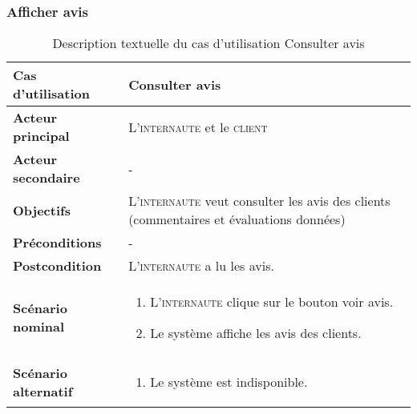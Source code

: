         \subsubsection[Consulter avis]{Afficher avis}
            \begin{longtable}{p{4cm} p{9cm}}
                \caption{Description textuelle du cas d’utilisation Consulter avis}
                \label{table:usecaseConsulterAvis}
                \\\hline\hline
                    \textbf{Cas d’utilisation} & \textbf{Consulter avis}
                \\\hline\hline
                        \textbf{Acteur principal} & L’\textsc{internaute} et le \textsc{client}
                    \\
                        \textbf{Acteur secondaire} & -
                    \\
                        \textbf{Objectifs} & L’\textsc{internaute} veut consulter les
                        avis des clients (commentaires et évaluations données)
                    \\
                        \textbf{Préconditions} & -
                    \\
                    \textbf{Postcondition} & L’\textsc{internaute} a lu les avis.
                    \\
                    \textbf{Scénario nominal} &
                        \begin{enumerate}[leftmargin=*]
                            \item L’\textsc{internaute} clique sur le bouton
                            voir avis.
                            \item Le système affiche les avis des clients.
                        \end{enumerate}
                    \\
                    \textbf{Scénario alternatif} &
                        \begin{enumerate}[leftmargin=*]
                            \item Le système est indisponible.
                        \end{enumerate}
                \\\bottomrule
            \end{longtable}

